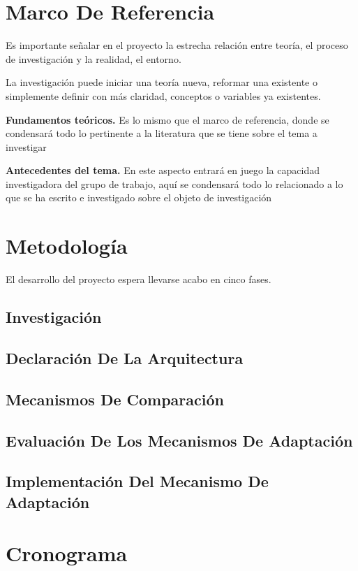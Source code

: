 \documentclass[12pt]{article}
\begin{document}
    \section{Marco De Referencia}

    Es importante señalar en el proyecto la estrecha relación entre teoría, el proceso de investigación y la realidad, el entorno. 

    La investigación puede iniciar una teoría nueva, reformar una existente o simplemente definir con más claridad, conceptos o variables ya existentes.

    \textbf{Fundamentos teóricos.} Es lo mismo que el marco de referencia, donde se condensará todo lo pertinente a la literatura que se tiene sobre el tema a investigar
    
    \textbf{Antecedentes del tema.}  En este aspecto entrará en juego la capacidad investigadora del grupo de trabajo, aquí se condensará todo lo relacionado a lo que se ha escrito e investigado sobre el objeto de investigación

    \section{Metodología}

    El desarrollo del proyecto espera llevarse acabo en cinco fases.

    \subsection{Investigación}


    \subsection{Declaración De La Arquitectura}
    

    \subsection{Mecanismos De Comparación}
    \subsection{Evaluación De Los Mecanismos De Adaptación}
    \subsection{Implementación Del Mecanismo De Adaptación}


    \section{Cronograma}
\end{document}
